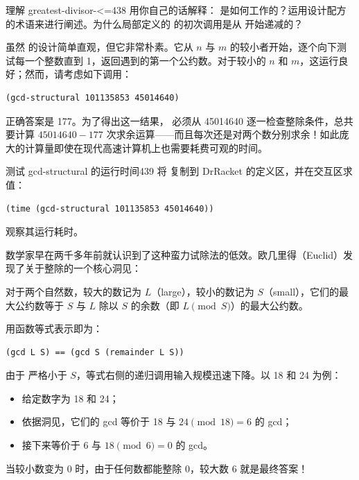 \begin{exercise}{理解 greatest-divisor-<=}{438}\label{ex:438}
用你自己的话解释： 是如何工作的？运用设计配方的术语来进行阐述。为什么局部定义的  的初次调用是从  开始递减的？
\end{exercise}

虽然  的设计简单直观，但它非常朴素。它从 $n$ 与 $m$ 的较小者开始，逐个向下测试每一个整数直到 1，返回遇到的第一个公约数。对于较小的 $n$ 和 $m$，这运行良好；然而，请考虑如下调用：

\begin{lstlisting}[language=BSL]
(gcd-structural 101135853 45014640)
\end{lstlisting}

正确答案是 177。为了得出这一结果， 必须从 45014640 逐一检查整除条件，总共要计算 $45014640 - 177$ 次求余运算——而且每次还是对两个数分别求余！如此庞大的计算量即使在现代高速计算机上也需要耗费可观的时间。

\begin{exercise}{测试 gcd-structural 的运行时间}{439}\label{ex:439}
将  复制到 DrRacket 的定义区，并在交互区求值：
\begin{lstlisting}[language=BSL]
(time (gcd-structural 101135853 45014640))
\end{lstlisting}
观察其运行耗时。
\end{exercise}

数学家早在两千多年前就认识到了这种蛮力试除法的低效。欧几里得（Euclid）发现了关于整除的一个核心洞见：
\begin{notebox}[欧几里得洞见]
对于两个自然数，较大的数记为 $L$（large），较小的数记为 $S$（small），它们的最大公约数等于 $S$ 与 $L$ 除以 $S$ 的余数（即 $L \pmod S$）的最大公约数。
\end{notebox}

用函数等式表示即为：
\begin{lstlisting}[language=BSL]
(gcd L S) == (gcd S (remainder L S))
\end{lstlisting}

由于  严格小于 $S$，等式右侧的递归调用输入规模迅速下降。以 18 和 24 为例：
\begin{itemize}
  \item 给定数字为 18 和 24；
  \item 依据洞见，它们的 gcd 等价于 18 与 $24 \pmod{18} = 6$ 的 gcd；
  \item 接下来等价于 6 与 $18 \pmod 6 = 0$ 的 gcd。
\end{itemize}
当较小数变为 0 时，由于任何数都能整除 0，较大数 6 就是最终答案！

